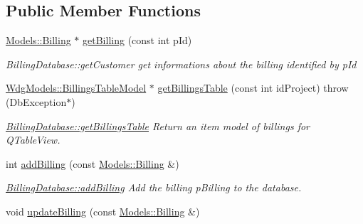 \subsection*{Public Member Functions}
\begin{DoxyCompactItemize}
\item 
\hyperlink{classModels_1_1Billing}{Models\-::\-Billing} $\ast$ \hyperlink{classDatabases_1_1BillingDatabase_a835d4ca35a046fe1d0b336a1b8cf8f85}{get\-Billing} (const int p\-Id)
\begin{DoxyCompactList}\small\item\em Billing\-Database\-::get\-Customer get informations about the billing identified by {\itshape p\-Id} \end{DoxyCompactList}\item 
\hyperlink{classGui_1_1Widgets_1_1WdgModels_1_1BillingsTableModel}{Wdg\-Models\-::\-Billings\-Table\-Model} $\ast$ \hyperlink{classDatabases_1_1BillingDatabase_ade754e6aa116aa75606cf24474631322}{get\-Billings\-Table} (const int id\-Project)  throw (\-Db\-Exception$\ast$)
\begin{DoxyCompactList}\small\item\em \hyperlink{classDatabases_1_1BillingDatabase_ade754e6aa116aa75606cf24474631322}{Billing\-Database\-::get\-Billings\-Table} Return an item model of billings for Q\-Table\-View. \end{DoxyCompactList}\item 
int \hyperlink{classDatabases_1_1BillingDatabase_a656c622366884194a6823b679d7d2f63}{add\-Billing} (const \hyperlink{classModels_1_1Billing}{Models\-::\-Billing} \&)
\begin{DoxyCompactList}\small\item\em \hyperlink{classDatabases_1_1BillingDatabase_a656c622366884194a6823b679d7d2f63}{Billing\-Database\-::add\-Billing} Add the billing {\itshape p\-Billing} to the database. \end{DoxyCompactList}\item 
\hypertarget{classDatabases_1_1BillingDatabase_a74643c7e242cfe6fc294985984d6a65f}{void \hyperlink{classDatabases_1_1BillingDatabase_a74643c7e242cfe6fc294985984d6a65f}{update\-Billing} (const \hyperlink{classModels_1_1Billing}{Models\-::\-Billing} \&)}\label{classDatabases_1_1BillingDatabase_a74643c7e242cfe6fc294985984d6a65f}


\end{DoxyCompactItemize}
